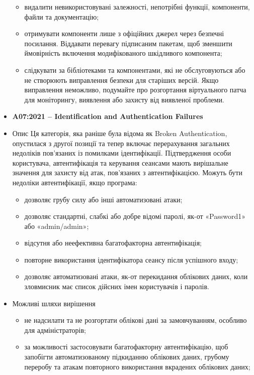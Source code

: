 \begin{itemize}
\begin{itemize}
                     \item видалити невикористовувані залежності, непотрібні функції, компоненти, файли та документацію;
                     \item отримувати компоненти лише з офіційних джерел через безпечні посилання. Віддавати перевагу підписаним пакетам, щоб зменшити ймовірність включення модифікованого шкідливого компонента;
                     \item слідкувати за бібліотеками та компонентами, які не обслуговуються або не створюють виправлення безпеки для старіших версій. Якщо виправлення неможливо, подумайте про розгортання віртуального патча для моніторингу, виявлення або захисту від виявленої проблеми.
                 \end{itemize}
    \item \textbf{A07:2021 – Identification and Authentication Failures}
            \item Опис
            Ця категорія, яка раніше була відома як Broken Authentication, опустилася з другої позиції та тепер включає перерахування загальних недоліків пов’язаних із помилками ідентифікації. Підтвердження особи користувача, автентифікація та керування сеансами мають вирішальне значення для захисту від атак, пов’язаних з автентифікацією. Можуть бути недоліки автентифікації, якщо програма:
            \begin{itemize}
                \item дозволяє грубу силу або інші автоматизовані атаки;
                \item дозволяє стандартні, слабкі або добре відомі паролі, як-от «Password1» або «admin/admin»;
                \item відсутня або неефективна багатофакторна автентифікація;
                \item повторне використання ідентифікатора сеансу після успішного входу;
                \item дозволяє автоматизовані атаки, як-от перекидання облікових даних, коли зловмисник має список дійсних імен користувачів і паролів.
            \end{itemize}
            \item Можливі шляхи вирішення
                \begin{itemize}
                    \item не надсилати та не розгортати облікові дані за замовчуванням, особливо для адміністраторів;
                    \item за можливості застосовувати багатофакторну автентифікацію, щоб запобігти автоматизованому підкиданню облікових даних, грубому переробу та атакам повторного використання вкрадених облікових даних;

\end{itemize}
\end{itemize}
